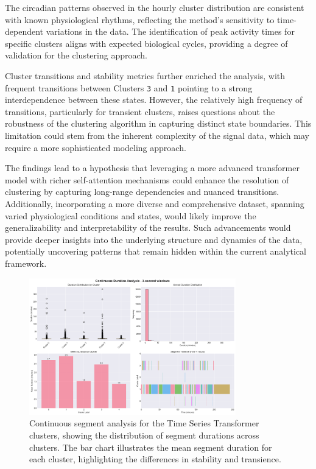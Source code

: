 \documentclass[a4paper,12pt,twoside]{article}
\begin{document}
The circadian patterns observed in the hourly cluster distribution are consistent with known physiological rhythms, reflecting the method's sensitivity to time-dependent variations in the data. The identification of peak activity times for specific clusters aligns with expected biological cycles, providing a degree of validation for the clustering approach.

Cluster transitions and stability metrics further enriched the analysis, with frequent transitions between Clusters \texttt{3} and \texttt{1} pointing to a strong interdependence between these states. However, the relatively high frequency of transitions, particularly for transient clusters, raises questions about the robustness of the clustering algorithm in capturing distinct state boundaries. This limitation could stem from the inherent complexity of the signal data, which may require a more sophisticated modeling approach.

The findings lead to a hypothesis that leveraging a more advanced transformer model with richer self-attention mechanisms could enhance the resolution of clustering by capturing long-range dependencies and nuanced transitions. Additionally, incorporating a more diverse and comprehensive dataset, spanning varied physiological conditions and states, would likely improve the generalizability and interpretability of the results. Such advancements would provide deeper insights into the underlying structure and dynamics of the data, potentially uncovering patterns that remain hidden within the current analytical framework.

\begin{figure}[H]
\centering
\includegraphics[width=0.8\textwidth]{img/tst continous duration analysis.png}
\caption{Continuous segment analysis for the Time Series Transformer clusters, showing the distribution of segment durations across clusters. The bar chart illustrates the mean segment duration for each cluster, highlighting the differences in stability and transience.}
\label{fig:tst_continuous_duration_analysis}
\end{figure}
\end{document}
